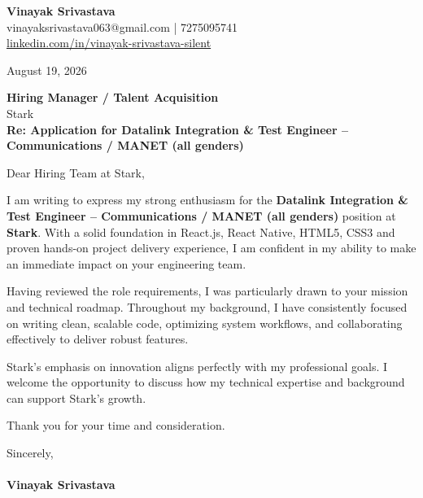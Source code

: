 \documentclass[11pt,a4paper]{article}
\begin{document}
\thispagestyle{empty}

{\Large \textbf{Vinayak Srivastava}}\\
vinayaksrivastava063@gmail.com | 7275095741 \\
\url{linkedin.com/in/vinayak-srivastava-silent}

\vspace{1em}
\hfill August 19, 2026

\textbf{Hiring Manager / Talent Acquisition}\\
Stark\\

\vspace{1.5em}
\textbf{Re: Application for Datalink Integration & Test Engineer – Communications / MANET (all genders)}

\vspace{1em}
Dear Hiring Team at Stark,

I am writing to express my strong enthusiasm for the \textbf{Datalink Integration & Test Engineer – Communications / MANET (all genders)} position at \textbf{Stark}. With a solid foundation in React.js, React Native, HTML5, CSS3 and proven hands-on project delivery experience, I am confident in my ability to make an immediate impact on your engineering team.

Having reviewed the role requirements, I was particularly drawn to your mission and technical roadmap. Throughout my background, I have consistently focused on writing clean, scalable code, optimizing system workflows, and collaborating effectively to deliver robust features.

Stark's emphasis on innovation aligns perfectly with my professional goals. I welcome the opportunity to discuss how my technical expertise and background can support Stark's growth.

Thank you for your time and consideration.

\vspace{1.5em}
Sincerely,\\
\vspace{1em}\\
\textbf{Vinayak Srivastava}
\end{document}
